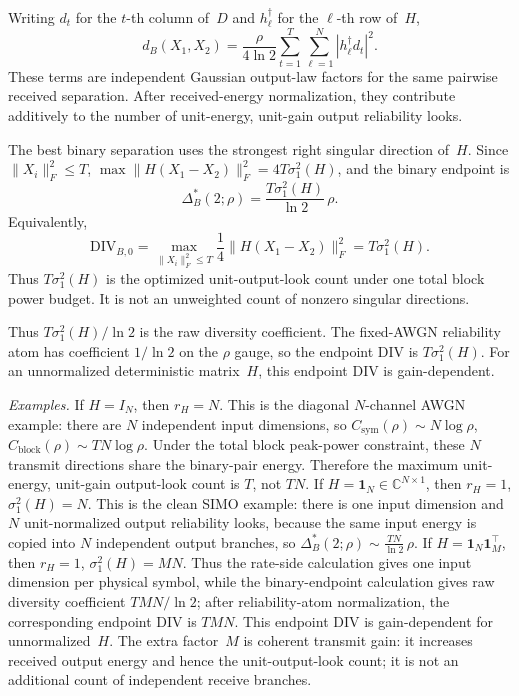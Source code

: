 \documentclass[lettersize,onecolumn]{IEEEtran}
\newcommand{\C}{\mathbb{C}}
\newcommand{\snr}{\rho}
\begin{document}
Writing $d_t$ for the $t$-th column of~$D$ and $h_\ell^\dagger$ for
the $\ell$-th row of~$H$,
\begin{equation}\label{eq:det_div_looks}
d_B(X_1, X_2) = \frac{\snr}{4\ln 2}
  \sum_{t=1}^{T}\sum_{\ell=1}^{N} |h_\ell^\dagger d_t|^2.
\end{equation}
These terms are independent Gaussian output-law factors for the same
pairwise received separation. After received-energy normalization,
they contribute additively to the number of unit-energy, unit-gain
output reliability looks.

The best binary separation uses the strongest right singular direction
of~$H$. Since $\|X_i\|_F^2 \le T$,
$\max \|H(X_1-X_2)\|_F^2 = 4T\sigma_1^2(H)$, and the binary
endpoint is
\begin{equation}\label{eq:div_exponent}
\Delta_B^*(2;\snr) = \frac{T\sigma_1^2(H)}{\ln 2}\,\snr.
\end{equation}
Equivalently,
\[
\mathrm{DIV}_{B,0}
=
\max_{\|X_i\|_F^2\le T}
\frac14\|H(X_1-X_2)\|_F^2
=
T\sigma_1^2(H).
\]
Thus $T\sigma_1^2(H)$ is the optimized unit-output-look count under
one total block power budget. It is not an unweighted count of
nonzero singular directions.

Thus $T\sigma_1^2(H)/\ln 2$ is the raw diversity coefficient.
The fixed-AWGN reliability atom has coefficient
$1/\ln 2$ on the $\snr$ gauge, so the endpoint DIV is
$T\sigma_1^2(H)$. For an unnormalized deterministic matrix~$H$, this
endpoint DIV is gain-dependent.

\emph{Examples.}
If $H = I_N$, then $r_H = N$. This is the diagonal $N$-channel
AWGN example: there are $N$ independent input dimensions, so
$C_{\mathrm{sym}}(\snr) \sim N\log\snr$,
$C_{\mathrm{block}}(\snr) \sim TN\log\snr$.
Under the total block peak-power constraint, these $N$ transmit
directions share the binary-pair energy. Therefore the maximum
unit-energy, unit-gain output-look count is $T$, not $TN$.
If $H = \mathbf{1}_N \in \C^{N\times 1}$, then
$r_H = 1$, $\sigma_1^2(H) = N$. This is the clean SIMO example:
there is one input dimension and $N$ unit-normalized output
reliability looks, because the same input energy is copied into $N$
independent output branches, so
$\Delta_B^*(2;\snr) \sim \frac{TN}{\ln 2}\,\snr$.
If $H = \mathbf{1}_N\mathbf{1}_M^\top$, then
$r_H = 1$, $\sigma_1^2(H) = MN$. Thus the rate-side calculation gives one input dimension
per physical symbol, while the binary-endpoint
calculation gives raw diversity coefficient $TMN/\ln 2$; after reliability-atom
normalization, the corresponding endpoint DIV is $TMN$.
This endpoint DIV is gain-dependent for unnormalized~$H$.
The extra factor~$M$ is coherent transmit gain: it increases received
output energy and hence the unit-output-look count; it is not an
additional count of independent receive branches.
\end{document}
